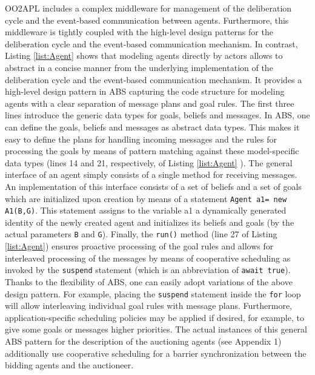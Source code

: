 OO2APL includes a complex middleware for management of the deliberation cycle and the event-based communication between agents. 
Furthermore, this middleware is tightly coupled with the high-level design patterns for the deliberation cycle and the event-based communication mechanism.
In contrast, Listing \ref{list:Agent} shows that modeling agents directly by actors allows to abstract in a concise manner from the underlying implementation of the deliberation cycle and the event-based communication mechanism.
It provides a high-level design pattern in ABS capturing the code structure for modeling agents with a clear separation of message plans and goal rules. 
The first three lines introduce the generic data types for goals, beliefs and messages.
In ABS, one can define the goals, beliefs and messages as abstract data types.
This makes it easy to define the plans for handling incoming messages and the rules for processing the goals by means of pattern matching against these model-specific data types (lines 14 and 21, respectively, of Listing \ref{list:Agent} ).
The general interface of an agent simply consists of a single method for receiving messages. An implementation of this interface consists of a set of beliefs and a set of goals which are initialized upon creation by means of a statement
\lstinline|Agent a1= new A1(B,G)|.
This statement assigns to the variable a1 a dynamically generated identity of the newly created agent and initializes its beliefs and goals (by the actual parameters \lstinline|B| and \lstinline|G|).
Finally, the \lstinline|run()| method (line 27 of Listing \ref{list:Agent}) ensures proactive processing of the goal rules and allows for
interleaved processing of the messages by means of cooperative scheduling as invoked by the \lstinline|suspend| statement (which is an abbreviation of \lstinline|await true|).
Thanks to the flexibility of ABS, one can easily adopt variations of the above design pattern.
For example, placing the \lstinline|suspend| statement inside the \lstinline|for| loop will allow interleaving individual goal rules with message plans.
Furthermore, application-specific scheduling policies \cite{rabs,cog} may be applied if desired, for example, to give some goals or messages higher priorities.
The actual instances of this general ABS pattern for the description of the auctioning agents (see Appendix 1) additionally use cooperative scheduling for a barrier synchronization between the bidding agents
and the auctioneer. 



